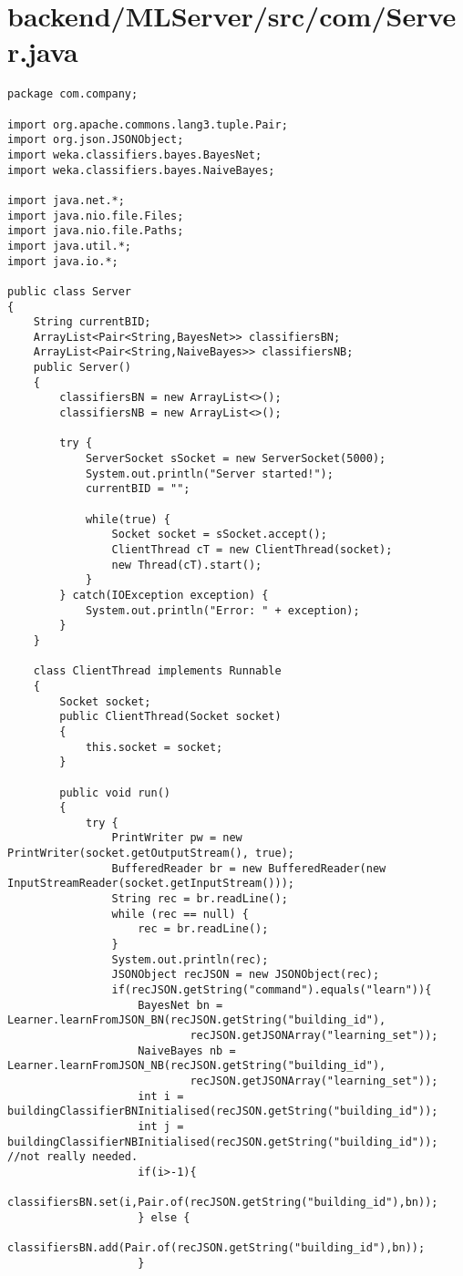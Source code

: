 \section{backend/MLServer/src/com/Server.java}
\begin{lstlisting}package com.company;

import org.apache.commons.lang3.tuple.Pair;
import org.json.JSONObject;
import weka.classifiers.bayes.BayesNet;
import weka.classifiers.bayes.NaiveBayes;

import java.net.*;
import java.nio.file.Files;
import java.nio.file.Paths;
import java.util.*;
import java.io.*;

public class Server
{
    String currentBID;
    ArrayList<Pair<String,BayesNet>> classifiersBN;
    ArrayList<Pair<String,NaiveBayes>> classifiersNB;
    public Server()
    {
        classifiersBN = new ArrayList<>();
        classifiersNB = new ArrayList<>();

        try {
            ServerSocket sSocket = new ServerSocket(5000);
            System.out.println("Server started!");
            currentBID = "";

            while(true) {
                Socket socket = sSocket.accept();
                ClientThread cT = new ClientThread(socket);
                new Thread(cT).start();
            }
        } catch(IOException exception) {
            System.out.println("Error: " + exception);
        }
    }

    class ClientThread implements Runnable
    {
        Socket socket;
        public ClientThread(Socket socket)
        {
            this.socket = socket;
        }

        public void run()
        {
            try {
                PrintWriter pw = new PrintWriter(socket.getOutputStream(), true);
                BufferedReader br = new BufferedReader(new InputStreamReader(socket.getInputStream()));
                String rec = br.readLine();
                while (rec == null) {
                    rec = br.readLine();
                }
                System.out.println(rec);
                JSONObject recJSON = new JSONObject(rec);
                if(recJSON.getString("command").equals("learn")){
                    BayesNet bn = Learner.learnFromJSON_BN(recJSON.getString("building_id"),
                            recJSON.getJSONArray("learning_set"));
                    NaiveBayes nb = Learner.learnFromJSON_NB(recJSON.getString("building_id"),
                            recJSON.getJSONArray("learning_set"));
                    int i = buildingClassifierBNInitialised(recJSON.getString("building_id"));
                    int j = buildingClassifierNBInitialised(recJSON.getString("building_id")); //not really needed.
                    if(i>-1){
                        classifiersBN.set(i,Pair.of(recJSON.getString("building_id"),bn));
                    } else {
                        classifiersBN.add(Pair.of(recJSON.getString("building_id"),bn));
                    }


\end{lstlisting}
